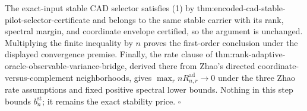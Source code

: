 The exact-input stable CAD selector satisfies (1) by thm:encoded-cad-stable-pilot-selector-certificate and belongs to the same stable carrier with its rank, spectral margin, and coordinate envelope certified, so the argument is unchanged.  Multiplying the finite inequality by \(n\) proves the first-order conclusion under the displayed convergence premise.  Finally, the rate clause of thm:rank-adaptive-oracle-observable-variance-bridge, derived there from Zhao's directed coordinate-versus-complement neighborhoods, gives \(\max_r nR_{n,r}^{\mathrm{ad}}\to0\) under the three Zhao rate assumptions and fixed positive spectral lower bounds.  Nothing in this step bounds \(b_n^{\mathrm{st}}\); it remains the exact stability price. \(\square\)
